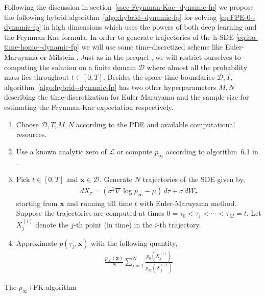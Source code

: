 Following the discussion in section~\ref{ssec-Feynman-Kac--dynamic-fp} we propose the following hybrid algorithm~\ref{algo:hybrid--dynamic-fp} for solving \eqref{eq:FPE-0--dynamic-fp} in high dimensions which uses the powers of both deep learning and the Feynman-Kac formula. In order to generate trajectories of the h-SDE \eqref{eq:ito-time-homo--dynamic-fp} we will use some time-discretized scheme like Euler-Maruyama or Milstein \cite{kloeden1992stochastic}. Just as in the prequel \cite{mandal2023learning}, we will restrict ourselves to computing the solution on a finite domain $\mathcal D$ where almost all the probability mass lies throughout $t\in[0, T]$. Besides the space-time boundaries $\mathcal D, T$, algorithm~\ref{algo:hybrid--dynamic-fp} has two other hyperparameters $M,N$ describing the time-discretization for Euler-Maruyama and the sample-size for estimating the Feynman-Kac expectation respectively.

\begin{algorithm}[!ht]
\begin{enumerate}
    \item Choose $\mathcal D, T, M, N$ according to the PDE and available computational resources.
    \item Use a known analytic zero of $\mathcal L$ or compute $p_\infty$ according to algorithm~6.1 in \cite{mandal2023learning}.
    \item Pick $t\in[0, T]$ and $\mathbf x\in\mathcal D$. Generate $N$ trajectories of the SDE given by, 
    \begin{align*}
        dX_\tau = (\sigma^2\nabla \log p_\infty - \mu)\,d\tau + \sigma\,dW_\tau
    \end{align*}
    starting from $\mathbf x$ and running till time $t$ with Euler-Maruyama method. Suppose the trajectories are computed at times $0=\tau_0<\tau_1<\cdots<\tau_M=t$. Let $X^{(i)}_{j}$ denote the $j$-th point (in time) in the $i$-th trajectory.
    \item Approximate $p(\tau_j, \mathbf x)$ with the following quantity, \begin{align*}
        \frac{p_\infty(\mathbf x)}{N}\sum_{i=1}^N\frac{p_0(X^{(i)}_{j})}{p_\infty(X^{(i)}_{j})}
    \end{align*}
    \end{enumerate}
    \caption{The $p_\infty$+FK algorithm}\label{algo:hybrid--dynamic-fp}
\end{algorithm}
    
